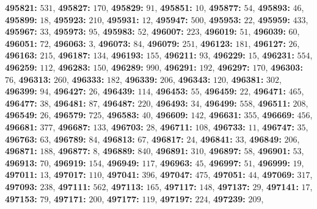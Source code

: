 \textsf{\bfseries 495821:} $531$, \textsf{\bfseries 495827:} $170$, \textsf{\bfseries 495829:} $91$, \textsf{\bfseries 495851:} $10$, \textsf{\bfseries 495877:} $54$, \textsf{\bfseries 495893:} $46$, \textsf{\bfseries 495899:} $18$, \textsf{\bfseries 495923:} $210$, \textsf{\bfseries 495931:} $12$, \textsf{\bfseries 495947:} $500$, \textsf{\bfseries 495953:} $22$, \textsf{\bfseries 495959:} $433$, \textsf{\bfseries 495967:} $33$, \textsf{\bfseries 495973:} $95$, \textsf{\bfseries 495983:} $52$, \textsf{\bfseries 496007:} $223$, \textsf{\bfseries 496019:} $51$, \textsf{\bfseries 496039:} $60$, \textsf{\bfseries 496051:} $72$, \textsf{\bfseries 496063:} $3$, \textsf{\bfseries 496073:} $84$, \textsf{\bfseries 496079:} $251$, \textsf{\bfseries 496123:} $181$, \textsf{\bfseries 496127:} $26$, \textsf{\bfseries 496163:} $215$, \textsf{\bfseries 496187:} $134$, \textsf{\bfseries 496193:} $155$, \textsf{\bfseries 496211:} $93$, \textsf{\bfseries 496229:} $15$, \textsf{\bfseries 496231:} $554$, \textsf{\bfseries 496259:} $112$, \textsf{\bfseries 496283:} $150$, \textsf{\bfseries 496289:} $990$, \textsf{\bfseries 496291:} $192$, \textsf{\bfseries 496297:} $170$, \textsf{\bfseries 496303:} $76$, \textsf{\bfseries 496313:} $260$, \textsf{\bfseries 496333:} $182$, \textsf{\bfseries 496339:} $206$, \textsf{\bfseries 496343:} $120$, \textsf{\bfseries 496381:} $302$, \textsf{\bfseries 496399:} $94$, \textsf{\bfseries 496427:} $26$, \textsf{\bfseries 496439:} $114$, \textsf{\bfseries 496453:} $55$, \textsf{\bfseries 496459:} $22$, \textsf{\bfseries 496471:} $465$, \textsf{\bfseries 496477:} $38$, \textsf{\bfseries 496481:} $87$, \textsf{\bfseries 496487:} $220$, \textsf{\bfseries 496493:} $34$, \textsf{\bfseries 496499:} $558$, \textsf{\bfseries 496511:} $208$, \textsf{\bfseries 496549:} $26$, \textsf{\bfseries 496579:} $725$, \textsf{\bfseries 496583:} $40$, \textsf{\bfseries 496609:} $142$, \textsf{\bfseries 496631:} $355$, \textsf{\bfseries 496669:} $456$, \textsf{\bfseries 496681:} $377$, \textsf{\bfseries 496687:} $133$, \textsf{\bfseries 496703:} $28$, \textsf{\bfseries 496711:} $108$, \textsf{\bfseries 496733:} $11$, \textsf{\bfseries 496747:} $35$, \textsf{\bfseries 496763:} $63$, \textsf{\bfseries 496789:} $84$, \textsf{\bfseries 496813:} $67$, \textsf{\bfseries 496817:} $24$, \textsf{\bfseries 496841:} $33$, \textsf{\bfseries 496849:} $206$, \textsf{\bfseries 496871:} $188$, \textsf{\bfseries 496877:} $8$, \textsf{\bfseries 496889:} $840$, \textsf{\bfseries 496891:} $310$, \textsf{\bfseries 496897:} $58$, \textsf{\bfseries 496901:} $53$, \textsf{\bfseries 496913:} $70$, \textsf{\bfseries 496919:} $154$, \textsf{\bfseries 496949:} $117$, \textsf{\bfseries 496963:} $45$, \textsf{\bfseries 496997:} $51$, \textsf{\bfseries 496999:} $19$, \textsf{\bfseries 497011:} $13$, \textsf{\bfseries 497017:} $110$, \textsf{\bfseries 497041:} $396$, \textsf{\bfseries 497047:} $475$, \textsf{\bfseries 497051:} $44$, \textsf{\bfseries 497069:} $317$, \textsf{\bfseries 497093:} $238$, \textsf{\bfseries 497111:} $562$, \textsf{\bfseries 497113:} $165$, \textsf{\bfseries 497117:} $148$, \textsf{\bfseries 497137:} $29$, \textsf{\bfseries 497141:} $17$, \textsf{\bfseries 497153:} $79$, \textsf{\bfseries 497171:} $200$, \textsf{\bfseries 497177:} $119$, \textsf{\bfseries 497197:} $224$, \textsf{\bfseries 497239:} $209$, 
